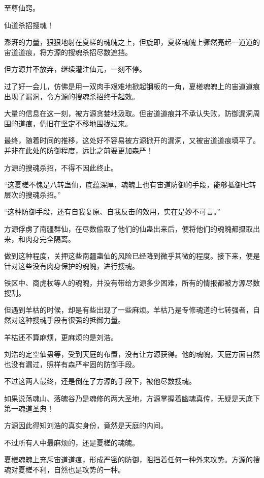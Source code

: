 
\begin{this_body}



至尊仙窍。

仙道杀招搜魂！

澎湃的力量，狠狠地射在夏槎的魂魄之上，但旋即，夏槎魂魄上骤然亮起一道道的宙道道痕，将方源的搜魂杀招尽数遮挡。

但方源并不放弃，继续灌注仙元，一刻不停。

过了好一会儿，仿佛是用一双肉手艰难地掀起钢板的一角，夏槎魂魄上的宙道道痕出现了漏洞，令方源的搜魂杀招终于起效。

大量的信息在这一刻，被方源贪婪地汲取。但宙道道痕并不承认失败，防御漏洞周围的道痕，仍旧在坚定不移地围拢过来。

最终，随着时间的推移，这处好不容易被方源掀开的漏洞，又被宙道道痕填平了。并非在此处的防御程度，远比之前要更加森严！

方源的搜魂杀招，不得不因此终止。

“这夏槎不愧是八转蛊仙，底蕴深厚，魂魄上也有宙道防御的手段，能够抵御七转层次的搜魂杀招。”

“这种防御手段，还有自我复原、自我反击的效用，实在是妙不可言。”

方源俘虏了南疆群仙，在尽数偷取了他们的仙蛊出来后，便将他们的魂魄都摄取出来，和肉身完全隔离。

做到这种程度，关押这些南疆蛊仙的风险已经降到微乎其微的程度。接下来，便是针对这些没有肉身保护的魂魄，进行搜魂。

铁区中、商虎杖等人的魂魄，并没有带给方源多少困难，所有的情报都被方源尽数搜刮。

但遇到羊枯的时候，却是有些出现了一些麻烦。羊枯乃是专修魂道的七转强者，自然对这种搜魂手段有很强的抵御力量。

羊枯还不算麻烦，更麻烦的是刘浩。

刘浩的定空仙蛊等，受到天庭的布置，没有让方源获得。他的魂魄，天庭方面自然也没有漏过，照样有森严牢固的防御手段。

不过这两人最终，还是倒在了方源的手段下，被他尽数搜魂。

如果说荡魂山、落魄谷乃是魂修的两大圣地，方源掌握着幽魂真传，无疑是天底下第一魂道圣典！

方源因此得知刘浩的真实身份，竟然是天庭的内间。

不过所有人中最麻烦的，还是夏槎的魂魄。

夏槎魂魄上充斥宙道道痕，形成严密的防御，阻挡着任何一种外来攻势。方源的搜魂对夏槎不利，自然也是攻势的一种。


\end{this_body}
